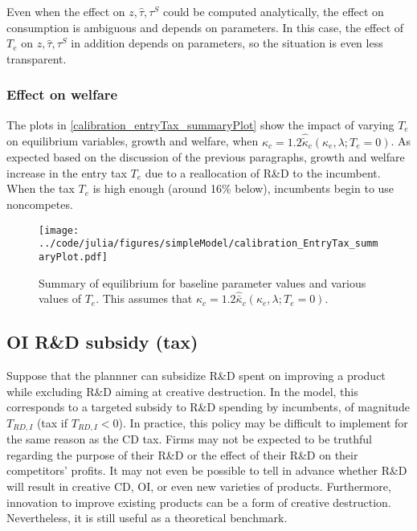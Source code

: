\documentclass[11pt,english]{article}
\theoremstyle{remark}
\begin{document}
Even when the effect on $z,\hat{\tau},\tau^S$ could be computed analytically, the effect on consumption is ambiguous and depends on parameters. In this case, the effect of $T_e$ on $z,\hat{\tau},\tau^S$ in addition depends on parameters, so the situation is even less transparent. 

\subsubsection{Effect on welfare}

The plots in \autoref{calibration_entryTax_summaryPlot} show the impact of varying $T_e$ on equilibrium variables, growth and welfare, when $\kappa_c = 1.2 \hat{\tilde{\kappa}}_c(\kappa_e,\lambda;T_e = 0)$. As expected based on the discussion of the previous paragraphs, growth and welfare increase in the entry tax $T_e$ due to a reallocation of R\&D to the incumbent. When the tax $T_e$ is high enough (around 16\% below), incumbents begin to use noncompetes.  

\begin{figure}[]
	\texttt{[image: ../code/julia/figures/simpleModel/calibration\_EntryTax\_summaryPlot.pdf]}
	\caption{Summary of equilibrium for baseline parameter values and various values of $T_e$. This assumes that $\kappa_c = 1.2 \hat{\bar{\kappa}}_c(\kappa_e,\lambda;T_e = 0)$.}
	\label{calibration_entryTax_summaryPlot}
\end{figure}

\subsection{OI R\&D subsidy (tax)}\label{cs:oi_rd_subsidy}

Suppose that the plannner can subsidize R\&D spent on improving a product while excluding R\&D aiming at creative destruction. In the model, this corresponds to a targeted subsidy to R\&D spending by incumbents, of magnitude $T_{RD,I}$ (tax if $T_{RD,I} < 0$). In practice, this policy may be difficult to implement for the same reason as the CD tax. Firms may not be expected to be truthful regarding the purpose of their R\&D or the effect of their R\&D on their competitors' profits. It may not even be possible to tell in advance whether R\&D will result in creative CD, OI, or even new varieties of products. Furthermore, innovation to improve existing products can be a form of creative destruction. Nevertheless, it is still useful as a theoretical benchmark.
\end{document}
